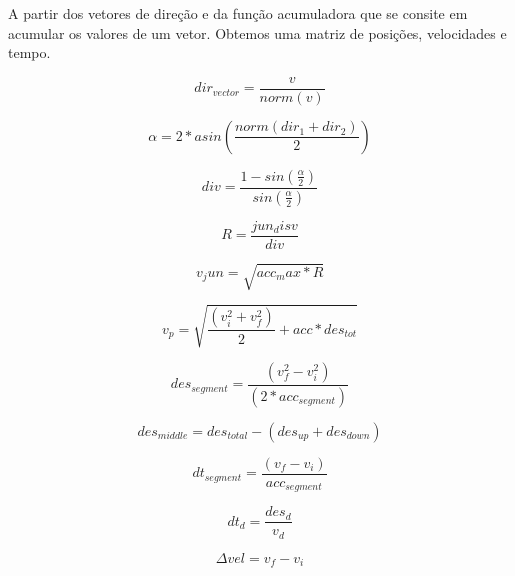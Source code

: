 A partir dos vetores de direção e da função acumuladora que se consite em acumular os valores de um vetor.
Obtemos uma matriz de posições, velocidades e tempo.

\begin{equation}
    \label{eq:dir_eq}
    dir_{vector} = \frac{v}{norm(v)}
\end{equation}

\begin{equation}
    \label{eq:alpha}
    \alpha = 2*asin\left(\frac{norm(dir_1+dir_2)}{2}\right)
\end{equation}

\begin{equation}
    \label{eq:div}
    div = \frac{1-sin\left(\frac{\alpha}{2}\right)}{sin(\frac{\alpha}{2})}
\end{equation}

\begin{equation}
    \label{eq:R_jun}
    R = \frac{jun_disv}{div}
\end{equation}

\begin{equation}
    \label{eq:v_jun}
    v_jun = \sqrt{acc_max*R}
\end{equation}





\begin{equation}
    \label{eq:v_p}
    v_p = \sqrt{\frac{(v_i^2+v_f^2)}{2}+acc*des_{tot}}
\end{equation}

\begin{equation}
    \label{eq:des_seg_acc}
    des_{segment} = \frac{(v_f^2-v_i^2)}{(2*acc_{segment})}
\end{equation}

\begin{equation}
    \label{eq:des_seg_no_acc}
    des_{middle} = des_{total}-(des_{up}+des_{down})
\end{equation}

\begin{equation}
    \label{eq:dt_seg_acc}
    dt_{segment} = \frac{(v_f-v_i)}{acc_{segment}}
\end{equation}

\begin{equation}
    \label{eq:dt_seg_no_acc}
    dt_d = \frac{des_d}{v_d}
\end{equation}

\begin{equation}
    \label{eq:delta_vel}
    \Delta vel = v_f-v_i
\end{equation}

